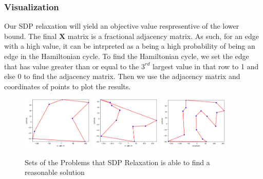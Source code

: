 \documentclass{article}
\begin{document}
\subsubsection{Visualization}
Our SDP relaxation will yield an objective value respresentive of the lower bound. 
The final $\mathbf{X}$ matrix is a fractional adjacency matrix. As such, for an edge with a high value,
it can be intrpreted as a being a high probability of being an edge in the Hamiltonian cycle.
To find the Hamiltonian cycle, we set the edge that has value greater   than or equal to the $3^{rd}$ largest value in that row to 1 and else 0 to find the adjacency matrix.
Then we use the adjacency matrix and coordinates of points to plot the results.
\begin{figure}[!ht]
    \centering
    \includegraphics[width=0.3\textwidth]{assets/tsp7.png}
    \includegraphics[width=0.3\textwidth]{assets/tsp-10.png}
    \includegraphics[width=0.3\textwidth]{assets/tsp-15-works.png}
    \caption{Sets of the Problems that SDP Relaxation is able to find a reasonable solution}
    \label{fig:TSP Graph}
\end{figure}
\end{document}
